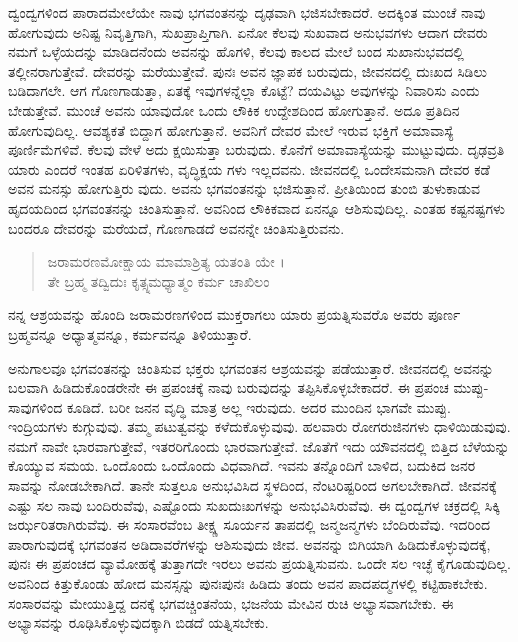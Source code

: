 ದ್ವಂದ್ವಗಳಿಂದ ಪಾರಾದಮೇಲೆಯೇ ನಾವು ಭಗವಂತನನ್ನು ದೃಢವಾಗಿ ಭಜಿಸಬೇಕಾದರೆ. ಅದಕ್ಕಿಂತ ಮುಂಚೆ ನಾವು ಹೋಗುವುದು ಅನಿಷ್ಟ ನಿವೃತ್ತಿಗಾಗಿ, ಸುಖಪ್ರಾಪ್ತಿಗಾಗಿ. ಏನೋ ಕೆಲವು ಸುಖವಾದ ಅನುಭವಗಳು ಆದಾಗ ದೇವರು ನಮಗೆ ಒಳ್ಳೆಯದನ್ನು ಮಾಡಿದನೆಂದು ಅವನನ್ನು ಹೊಗಳಿ, ಕೆಲವು ಕಾಲದ ಮೇಲೆ ಬಂದ ಸುಖಾನುಭವದಲ್ಲಿ ತಲ್ಲೀನರಾಗುತ್ತೇವೆ. ದೇವರನ್ನು ಮರೆಯುತ್ತೇವೆ. ಪುನಃ ಅವನ ಜ್ಞಾಪಕ ಬರುವುದು, ಜೀವನದಲ್ಲಿ ದುಃಖದ ಸಿಡಿಲು ಬಡಿದಾಗಲೇ. ಆಗ ಗೊಣಗಾಡುತ್ತಾ, ಏತಕ್ಕೆ ಇವುಗಳನ್ನೆಲ್ಲಾ ಕೊಟ್ಟೆ? ದಯವಿಟ್ಟು ಅವುಗಳನ್ನು ನಿವಾರಿಸು ಎಂದು ಬೇಡುತ್ತೇವೆ. ಮುಂಚೆ ಅವನು ಯಾವುದೋ ಒಂದು ಲೌಕಿಕ ಉದ್ದೇಶದಿಂದ ಹೋಗುತ್ತಾನೆ. ಅದೂ ಪ್ರತಿದಿನ ಹೋಗುವುದಿಲ್ಲ. ಆವಶ್ಯಕತೆ ಬಿದ್ದಾಗ ಹೋಗುತ್ತಾನೆ. ಅವನಿಗೆ ದೇವರ ಮೇಲೆ ಇರುವ ಭಕ್ತಿಗೆ ಅಮಾವಾಸ್ಯೆ ಪೂರ್ಣಿಮೆಗಳಿವೆ. ಕೆಲವು ವೇಳೆ ಅದು ಕ್ಷಯಿಸುತ್ತಾ ಬರುವುದು. ಕೊನೆಗೆ ಅಮಾವಾಸ್ಯೆಯನ್ನು ಮುಟ್ಟುವುದು. ದೃಢವ್ರತಿ ಯಾರು ಎಂದರೆ ಇಂತಹ ಏರಿಳಿತಗಳು, ವೃದ್ಧಿಕ್ಷಯ ಗಳು ಇಲ್ಲದವನು. ಜೀವನದಲ್ಲಿ ಒಂದೇಸಮನಾಗಿ ದೇವರ ಕಡೆ ಅವನ ಮನಸ್ಸು ಹೋಗುತ್ತಿರು ವುದು. ಅವನು ಭಗವಂತನನ್ನು ಭಜಿಸುತ್ತಾನೆ. ಪ್ರೀತಿಯಿಂದ ತುಂಬಿ ತುಳುಕಾಡುವ ಹೃದಯದಿಂದ ಭಗವಂತನನ್ನು ಚಿಂತಿಸುತ್ತಾನೆ. ಅವನಿಂದ ಲೌಕಿಕವಾದ ಏನನ್ನೂ ಆಶಿಸುವುದಿಲ್ಲ. ಎಂತಹ ಕಷ್ಟನಷ್ಟಗಳು ಬಂದರೂ ದೇವರನ್ನು ಮರೆಯದೆ, ಗೊಣಗಾಡದೆ ಅವನನ್ನೇ ಚಿಂತಿಸುತ್ತಿರುವನು.

\begin{verse}
ಜರಾಮರಣಮೋಕ್ಷಾಯ ಮಾಮಾಶ್ರಿತ್ಯ ಯತಂತಿ ಯೇ ।\\ತೇ ಬ್ರಹ್ಮ ತದ್ವಿದುಃ ಕೃತ್ಸ್ನಮಧ್ಯಾತ್ಮಂ ಕರ್ಮ ಚಾಖಿಲಂ 
\end{verse}

{\small ನನ್ನ ಆಶ್ರಯವನ್ನು ಹೊಂದಿ ಜರಾಮರಣಗಳಿಂದ ಮುಕ್ತರಾಗಲು ಯಾರು ಪ್ರಯತ್ನಿಸುವರೊ ಅವರು ಪೂರ್ಣ ಬ್ರಹ್ಮವನ್ನೂ ಅಧ್ಯಾತ್ಮವನ್ನೂ, ಕರ್ಮವನ್ನೂ ತಿಳಿಯುತ್ತಾರೆ.}

ಅನುಗಾಲವೂ ಭಗವಂತನನ್ನು ಚಿಂತಿಸುವ ಭಕ್ತರು ಭಗವಂತನ ಆಶ್ರಯವನ್ನು ಪಡೆಯುತ್ತಾರೆ. ಜೀವನದಲ್ಲಿ ಅವನನ್ನು ಬಲವಾಗಿ ಹಿಡಿದುಕೊಂಡರೇನೇ ಈ ಪ್ರಪಂಚಕ್ಕೆ ನಾವು ಬರುವುದನ್ನು ತಪ್ಪಿಸಿಕೊಳ್ಳಬೇಕಾದರೆ. ಈ ಪ್ರಪಂಚ ಮುಪ್ಪು-ಸಾವುಗಳಿಂದ ಕೂಡಿದೆ. ಬರೀ ಜನನ ವೃದ್ಧಿ ಮಾತ್ರ ಅಲ್ಲ ಇರುವುದು. ಅದರ ಮುಂದಿನ ಭಾಗವೇ ಮುಪ್ಪು. ಇಂದ್ರಿಯಗಳು ಕುಗ್ಗುವುವು. ತಮ್ಮ ಪಟುತ್ವವನ್ನು ಕಳೆದುಕೊಳ್ಳುವುವು. ಹಲವಾರು ರೋಗರುಜಿನಗಳು ಧಾಳಿಯಿಡುವುವು. ನಮಗೆ ನಾವೇ ಭಾರವಾಗುತ್ತೇವೆ, ಇತರರಿಗೊಂದು ಭಾರವಾಗುತ್ತೇವೆ. ಜೊತೆಗೆ ಇದು ಯೌವನದಲ್ಲಿ ಬಿತ್ತಿದ ಬೆಳೆಯನ್ನು ಕೊಯ್ಯುವ ಸಮಯ. ಒಂದೊಂದು ಒಂದೊಂದು ವಿಧವಾಗಿದೆ. ಇವನು ತನ್ನೊಂದಿಗೆ ಬಾಳಿದ, ಬದುಕಿದ ಜನರ ಸಾವನ್ನು ನೋಡಬೇಕಾಗಿದೆ. ತಾನೇ ಸುತ್ತಲೂ ಅನುಭವಿಸಿದ ಸ್ಥಳದಿಂದ, ನೆಂಟರಿಷ್ಟರಿಂದ ಅಗಲಬೇಕಾಗಿದೆ. ಜೀವನಕ್ಕೆ ಎಷ್ಟು ಸಲ ನಾವು ಬಂದಿರುವೆವು, ಎಷ್ಟೊಂದು ಸುಖದುಃಖಗಳನ್ನು ಅನುಭವಿಸಿರುವೆವು. ಈ ದ್ವಂದ್ವಗಳ ಚಕ್ರದಲ್ಲಿ ಸಿಕ್ಕಿ ಜರ್ಝರಿತರಾಗಿರುವೆವು. ಈ ಸಂಸಾರವೆಂಬ ತೀಕ್ಷ್ಣ ಸೂರ್ಯನ ತಾಪದಲ್ಲಿ ಜನ್ಮಜನ್ಮಗಳು ಬೆಂದಿರುವೆವು. ಇದರಿಂದ ಪಾರಾಗುವುದಕ್ಕೆ ಭಗವಂತನ ಅಡಿದಾವರೆಗಳನ್ನು ಆಶಿಸುವುದು ಜೀವ. ಅವನನ್ನು ಬಿಗಿಯಾಗಿ ಹಿಡಿದುಕೊಳ್ಳುವುದಕ್ಕೆ, ಪುನಃ ಈ ಪ್ರಪಂಚದ ವ್ಯಾಮೋಹಕ್ಕೆ ತುತ್ತಾಗದೇ ಇರಲು ಅವನು ಪ್ರಯತ್ನಿಸುವನು. ಒಂದೇ ಸಲ ಇಚ್ಛೆ ಕೈಗೂಡುವುದಿಲ್ಲ. ಅವನಿಂದ ಕಿತ್ತುಕೊಂಡು ಹೋದ ಮನಸ್ಸನ್ನು ಪುನಃಪುನಃ ಹಿಡಿದು ತಂದು ಅವನ ಪಾದಪದ್ಮಗಳಲ್ಲಿ ಕಟ್ಟಿಹಾಕಬೇಕು. ಸಂಸಾರವನ್ನು ಮೇಯುತ್ತಿದ್ದ ದನಕ್ಕೆ ಭಗವಚ್ಚಿಂತನೆಯ, ಭಜನೆಯ ಮೇವಿನ ರುಚಿ ಅಭ್ಯಾಸವಾಗಬೇಕು. ಈ ಅಭ್ಯಾಸವನ್ನು ರೂಢಿಸಿಕೊಳ್ಳುವುದಕ್ಕಾಗಿ ಬಿಡದೆ ಯತ್ನಿಸಬೇಕು.


